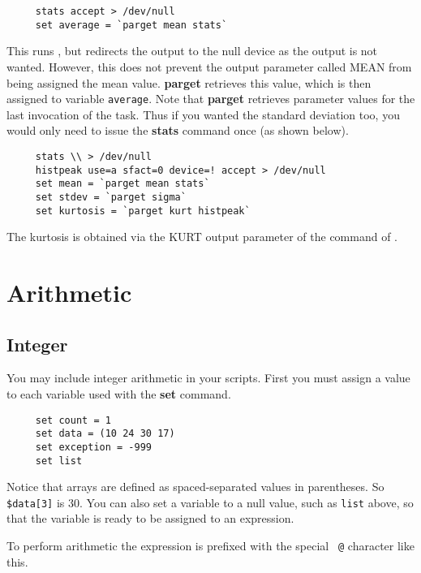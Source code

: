 \small
\begin{verbatim}
     stats accept > /dev/null
     set average = `parget mean stats`
\end{verbatim}
\normalsize
This runs , but redirects the output
to the null device as the output is not wanted.  However, this does
not prevent the output parameter called MEAN from being assigned the
mean value.  {\bf parget} retrieves this value, which is then assigned
to variable {\tt average}.  Note that {\bf parget} retrieves parameter
values for the last invocation of the task.  Thus if you wanted the
standard deviation too, you would only need to issue the {\bf stats}
command once (as shown below).

\small
\begin{verbatim}
     stats \\ > /dev/null
     histpeak use=a sfact=0 device=! accept > /dev/null
     set mean = `parget mean stats`
     set stdev = `parget sigma`
     set kurtosis = `parget kurt histpeak`
\end{verbatim}
\normalsize
The kurtosis is obtained via the KURT output parameter of the  command of \ESPref.

\newpage
\section{Arithmetic\label{sc4_se_csharith}}

\subsection{Integer\label{sc4_se_integer}}

You may include integer arithmetic in your scripts.  First you must
assign a value to each variable used with the {\bf set} command.

\small
\begin{verbatim}
     set count = 1
     set data = (10 24 30 17)
     set exception = -999
     set list
\end{verbatim}
\normalsize

Notice that arrays are defined as spaced-separated values in
parentheses.  So {\tt \$data[3]} is 30.  You can also set a variable
to a null value, such as {\tt list} above, so that the variable is
ready to be assigned to an expression.

To perform arithmetic the expression is prefixed with the special {\tt
@} character like this.

